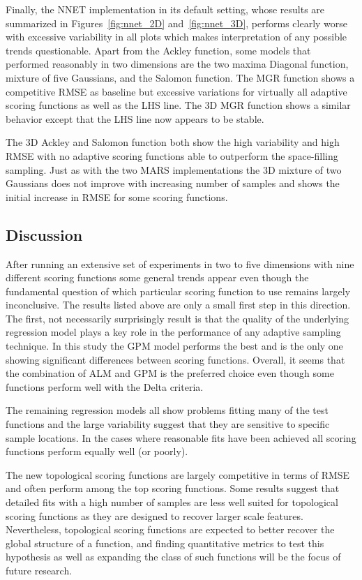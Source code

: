 Finally, the NNET implementation in its default setting, whose results are summarized in Figures~\ref{fig:nnet_2D} and~\ref{fig:nnet_3D}, performs clearly worse with excessive variability in all plots which makes interpretation of any possible trends questionable.
%
Apart from the Ackley function, some models that performed reasonably in two dimensions are the two maxima Diagonal function, mixture of five Gaussians, and the Salomon function.
%
The MGR function shows a competitive RMSE as baseline but excessive variations for virtually all adaptive scoring functions as well as the LHS line.
%
The 3D MGR function shows a similar behavior except that the LHS line now appears to be stable.

The 3D Ackley and Salomon function both show the high variability and high RMSE with no adaptive scoring functions able to outperform the space-filling sampling.
%
Just as with the two MARS implementations the 3D mixture of two Gaussians does not improve with increasing number of samples and shows the initial increase in RMSE for some scoring functions.

\subsection{Discussion}

After running an extensive set of experiments in two to five dimensions with nine different scoring functions some general trends appear even though the fundamental question of which particular scoring function to use remains largely inconclusive.
%
The results listed above are only a small first step in this direction.
%
The first, not necessarily surprisingly result is that the quality of the underlying regression model plays a key role in the performance of any adaptive sampling technique.
%
In this study the GPM model performs the best and is the only one showing significant differences between scoring functions.
%
Overall, it seems that the combination of ALM and GPM is the preferred choice even though some functions perform well with the Delta criteria.

The remaining regression models all show problems fitting many of the test functions and the large variability suggest that they are sensitive to specific sample locations.
%
In the cases where reasonable fits have been achieved all scoring functions perform equally well (or poorly).

The new topological scoring functions are largely competitive in terms of RMSE and often perform among the top scoring functions.
%
Some results suggest that detailed fits with a high number of samples are less well suited for topological scoring functions as they are designed to recover larger scale features.
%
Nevertheless, topological scoring functions are expected to better recover the global structure of a function, and finding quantitative metrics to test this hypothesis as well as expanding the class of such functions will be the focus of future research.

